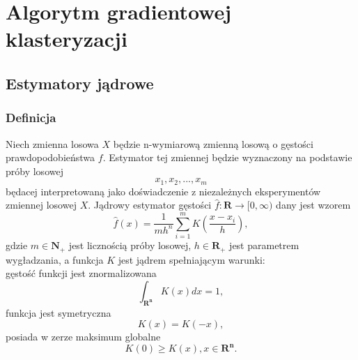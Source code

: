\chapter{Algorytm gradientowej klasteryzacji}
\label{cha:gradient_clustering_algorithm}

\section{Estymatory jądrowe}
\label{sec:estymatory}
\subsection{Definicja}

Niech zmienna losowa $X$ będzie n-wymiarową zmienną losową o gęstości prawdopodobieństwa $f$. Estymator tej zmiennej będzie wyznaczony na podstawie próby losowej
\begin{equation}
x_1, x_2, ..., x_m
\end{equation}
będacej interpretowaną jako doświadczenie z niezależnych eksperymentów zmiennej losowej $X$.
Jądrowy estymator gęstości $\hat{f}: \mathbf{R} \to [0, \infty)$ dany jest wzorem \cite{Kul05}
\begin{equation}
\label{eq:estymator}
\hat{f}(x)=\frac{1}{mh^n} \displaystyle \sum_{i=1}^{m}K(\frac{x-x_i}{h}),
\end{equation}
gdzie $m \in \mathbf{N_+}$ jest licznością próby losowej, $h \in \mathbf{R_+}$ jest parametrem wygładzania, a funkcja $K$ jest jądrem spełniającym warunki: \\
gęstość funkcji jest znormalizowana
\begin{equation}
\int_{\mathbf{R^n}} K(x)dx = 1,
\end{equation}
funkcja jest symetryczna
\begin{equation}
K(x) = K(-x),
\end{equation}
posiada w zerze maksimum globalne
\begin{equation}
K(0) \geq K(x), x \in \mathbf{R^n}.
\end{equation}

